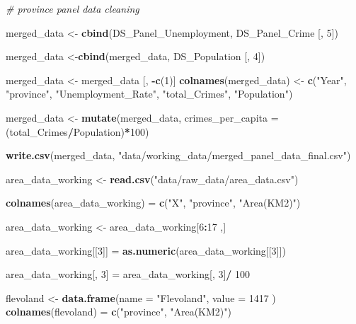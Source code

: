 \documentclass[
]{article}
\newenvironment{Shaded}{\begin{snugshade}}{\end{snugshade}}
\newcommand{\AttributeTok}[1]{\textcolor[rgb]{0.13,0.29,0.53}{#1}}
\newcommand{\CommentTok}[1]{\textcolor[rgb]{0.56,0.35,0.01}{\textit{#1}}}
\newcommand{\DecValTok}[1]{\textcolor[rgb]{0.00,0.00,0.81}{#1}}
\newcommand{\FunctionTok}[1]{\textcolor[rgb]{0.13,0.29,0.53}{\textbf{#1}}}
\newcommand{\NormalTok}[1]{#1}
\newcommand{\OtherTok}[1]{\textcolor[rgb]{0.56,0.35,0.01}{#1}}
\newcommand{\SpecialCharTok}[1]{\textcolor[rgb]{0.81,0.36,0.00}{\textbf{#1}}}
\newcommand{\StringTok}[1]{\textcolor[rgb]{0.31,0.60,0.02}{#1}}
\begin{document}
\begin{Shaded}
\begin{Highlighting}[]
\CommentTok{\# province panel data cleaning}

\NormalTok{merged\_data }\OtherTok{\textless{}{-}} \FunctionTok{cbind}\NormalTok{(DS\_Panel\_Unemployment, DS\_Panel\_Crime [, }\DecValTok{5}\NormalTok{])}

\NormalTok{merged\_data }\OtherTok{\textless{}{-}}\FunctionTok{cbind}\NormalTok{(merged\_data, DS\_Population [, }\DecValTok{4}\NormalTok{])}

\NormalTok{merged\_data }\OtherTok{\textless{}{-}}\NormalTok{ merged\_data [, }\SpecialCharTok{{-}}\FunctionTok{c}\NormalTok{(}\DecValTok{1}\NormalTok{)] }
\FunctionTok{colnames}\NormalTok{(merged\_data) }\OtherTok{\textless{}{-}} \FunctionTok{c}\NormalTok{(}\StringTok{"Year"}\NormalTok{, }\StringTok{"province"}\NormalTok{, }\StringTok{"Unemployment\_Rate"}\NormalTok{, }\StringTok{"total\_Crimes"}\NormalTok{, }\StringTok{"Population"}\NormalTok{)}

\NormalTok{merged\_data }\OtherTok{\textless{}{-}} \FunctionTok{mutate}\NormalTok{(merged\_data, }\AttributeTok{crimes\_per\_capita =}\NormalTok{ (total\_Crimes}\SpecialCharTok{/}\NormalTok{Population)}\SpecialCharTok{*}\DecValTok{100}\NormalTok{)}

\FunctionTok{write.csv}\NormalTok{(merged\_data, }\StringTok{"data/working\_data/merged\_panel\_data\_final.csv"}\NormalTok{)}

\NormalTok{area\_data\_working }\OtherTok{\textless{}{-}} \FunctionTok{read.csv}\NormalTok{(}\StringTok{"data/raw\_data/area\_data.csv"}\NormalTok{)}

\FunctionTok{colnames}\NormalTok{(area\_data\_working) }\OtherTok{=} \FunctionTok{c}\NormalTok{(}\StringTok{"X"}\NormalTok{, }\StringTok{"province"}\NormalTok{, }\StringTok{"Area(KM2)"}\NormalTok{)}

\NormalTok{area\_data\_working }\OtherTok{\textless{}{-}}\NormalTok{ area\_data\_working[}\DecValTok{6}\SpecialCharTok{:}\DecValTok{17}\NormalTok{ ,]}

\NormalTok{area\_data\_working[[}\DecValTok{3}\NormalTok{]]  }\OtherTok{=} \FunctionTok{as.numeric}\NormalTok{(area\_data\_working[[}\DecValTok{3}\NormalTok{]])}

\NormalTok{area\_data\_working[, }\DecValTok{3}\NormalTok{] }\OtherTok{=}\NormalTok{ area\_data\_working[, }\DecValTok{3}\NormalTok{]}\SpecialCharTok{/} \DecValTok{100}

\NormalTok{flevoland }\OtherTok{\textless{}{-}} \FunctionTok{data.frame}\NormalTok{(}\AttributeTok{name =} \StringTok{"Flevoland"}\NormalTok{, }\AttributeTok{value =} \DecValTok{1417}\NormalTok{ )}
\FunctionTok{colnames}\NormalTok{(flevoland) }\OtherTok{=} \FunctionTok{c}\NormalTok{(}\StringTok{"province"}\NormalTok{, }\StringTok{"Area(KM2)"}\NormalTok{)}


\end{Highlighting}
\end{Shaded}
\end{document}
